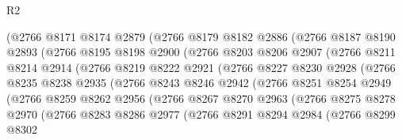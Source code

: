 \begin{lexlean}{R2}
\begin{coremodule}
                (@2766
                  @8171
                  @8174
                  @2879
                  (@2766
                    @8179
                    @8182
                    @2886
                    (@2766
                      @8187
                      @8190
                      @2893
                      (@2766
                        @8195
                        @8198
                        @2900
                        (@2766
                          @8203
                          @8206
                          @2907
                          (@2766
                            @8211
                            @8214
                            @2914
                            (@2766
                              @8219
                              @8222
                              @2921
                              (@2766
                                @8227
                                @8230
                                @2928
                                (@2766
                                  @8235
                                  @8238
                                  @2935
                                  (@2766
                                    @8243
                                    @8246
                                    @2942
                                    (@2766
                                      @8251
                                      @8254
                                      @2949
                                      (@2766
                                        @8259
                                        @8262
                                        @2956
                                        (@2766
                                          @8267
                                          @8270
                                          @2963
                                          (@2766
                                            @8275
                                            @8278
                                            @2970
                                            (@2766
                                              @8283
                                              @8286
                                              @2977
                                              (@2766
                                                @8291
                                                @8294
                                                @2984
                                                (@2766
                                                  @8299
                                                  @8302

\end{coremodule}
\end{lexlean}
